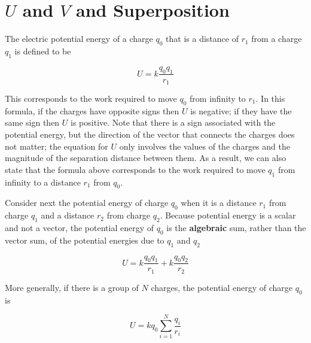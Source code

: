 \documentclass{article}
\begin{document}
\begin{enumerate}
        \vskip 48pt
        \fi

\end{enumerate}

\newpage

\section{$U$ and $V$ and Superposition}






The electric potential energy of a charge $q_0$ that is a distance of $r_1$ from a charge $q_1$ is defined to be 

$$
U=k\frac{q_0q_1}{r_1}
$$

This corresponds to the work required to move $q_0$ from infinity to $r_1$. 
In this formula, if the charges have opposite signs then $U$ is negative; if they have the same sign then $U$  is positive. Note that there is a sign associated with the potential energy, but the direction of the vector that connects the charges does not matter; the equation for $U$ only involves the values of the charges and the magnitude of the separation distance between them. As a result, we can also state that the formula above corresponds to the work required to move $q_1$ from infinity to a distance $r_1$ from $q_0$.

Consider next the potential energy of charge $q_0$ when it is a distance $r_1$ from charge $q_1$ and a distance $r_2$ from charge $q_2$. Because potential energy is a scalar and not a vector, the potential energy of $q_0$ is the {\bf algebraic} sum, rather than the vector sum, of the potential energies due to $q_1$ and $q_2$

$$
U=k\frac{q_0q_1}{r_1}+k\frac{q_0q_2}{r_2}
$$

More generally, if there is a group of $N$ charges, the potential energy of charge $q_0$ is

$$
U=k q_0 \sum_{i=1}^N {\frac{q_i}{r_i}}
$$
\end{document}
